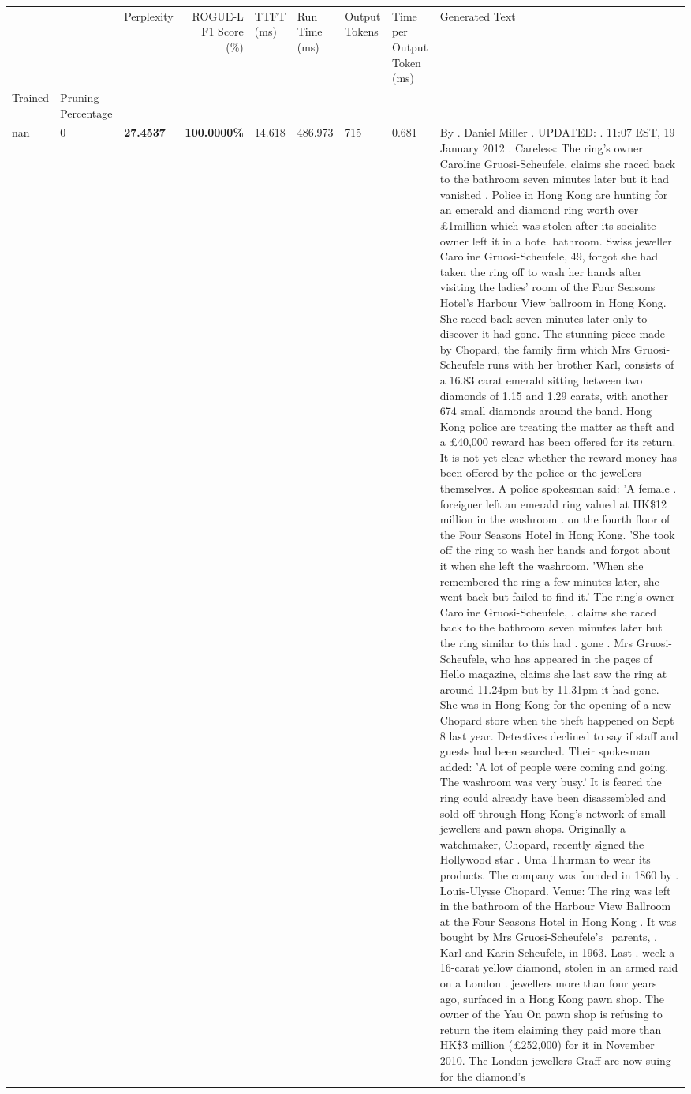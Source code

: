 \begin{table}[H]
\label{tab:evaluation-pipeline-2}
\begin{tabular}{lllrlllll}
\toprule
 &  & Perplexity & ROGUE-L F1 Score (\%) & TTFT (ms) & Run Time (ms) & Output Tokens & Time per Output Token (ms) & Generated Text \\
Trained & Pruning Percentage &  &  &  &  &  &  &  \\
\midrule
nan & 0 & \bfseries 27.4537 & \bfseries 100.0000\% & 14.618 & 486.973 & 715 & 0.681 & By . Daniel Miller . UPDATED: . 11:07 EST, 19 January 2012 . Careless: The ring's owner Caroline Gruosi-Scheufele, claims she raced back to the bathroom seven minutes later but it had vanished . Police in Hong Kong are hunting for an emerald and diamond ring worth over £1million which was stolen after its socialite owner left it in a hotel bathroom. Swiss jeweller Caroline Gruosi-Scheufele, 49, forgot she had taken the ring off to wash her hands after visiting the ladies' room of the Four Seasons Hotel's Harbour View ballroom in Hong Kong. She raced back seven minutes later only to discover it had gone. The stunning piece made by Chopard, the family firm which Mrs Gruosi-Scheufele runs with her brother Karl, consists of a 16.83 carat emerald sitting between two diamonds of 1.15 and 1.29 carats, with another 674 small diamonds around the band. Hong Kong police are treating the matter as theft and a £40,000 reward has been offered for its return. It is not yet clear whether the reward money has been offered by the police or the jewellers themselves. A police spokesman said: 'A female . foreigner left an emerald ring valued at HK\$12 million in the washroom . on the fourth floor of the Four Seasons Hotel in Hong Kong. 'She took off the ring to wash her hands and forgot about it when she left the washroom. 'When she remembered the ring a few minutes later, she went back but failed to find it.' The ring's owner Caroline Gruosi-Scheufele, . claims she raced back to the bathroom seven minutes later but the ring similar to this had . gone . Mrs Gruosi-Scheufele, who has appeared in the pages of Hello magazine, claims she last saw the ring at around 11.24pm but by 11.31pm it had gone. She was in Hong Kong for the opening of a new Chopard store when the theft happened on Sept 8 last year. Detectives declined to say if staff and guests had been searched. Their spokesman added: 'A lot of people were coming and going. The washroom was very busy.' It is feared the ring could already have been disassembled and sold off through Hong Kong's network of small jewellers and pawn shops. Originally a watchmaker, Chopard, recently signed the Hollywood star . Uma Thurman to wear its products. The company was founded in 1860 by . Louis-Ulysse Chopard. Venue: The ring was left in the bathroom of the Harbour View Ballroom at the Four Seasons Hotel in Hong Kong . It was bought by Mrs Gruosi-Scheufele's  parents, . Karl and Karin Scheufele, in 1963. Last . week a 16-carat yellow diamond, stolen in an armed raid on a London . jewellers more than four years ago, surfaced in a Hong Kong pawn shop. The owner of the Yau On pawn shop is refusing to return the item claiming they paid more than HK\$3 million (£252,000) for it in November 2010. The London jewellers Graff are now suing for the diamond’s 
\end{tabular}
\end{table}
